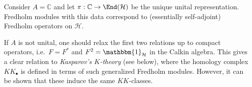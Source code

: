
    \begin{example}
        Consider $A=\mathbb{C}$ and let $\pi:\mathbb{C}\rightarrow\End(\mathcal{H})$ be the unique unital representation. Fredholm modules with this data correspond to (essentially self-adjoint) Fredholm operators on $\mathcal{H}$.
    \end{example}

    \begin{remark}
        If $A$ is not unital, one should relax the first two relations up to compact operators, i.e.~$F=F^*$ and $F^2=\mathbbm{1}_\mathcal{H}$ in the Calkin algebra. This gives a clear relation to \textit{Kasparov's $K$-theory} (see below), where the homology complex $K\!K_\bullet$ is defined in terms of such generalized Fredholm modules. However, it can be shown that these induce the same $K\!K$-classes.
    \end{remark}

